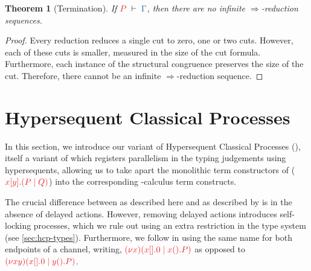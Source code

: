 \documentclass[submission,copyright,creativecommons]{eptcs}
\newtheorem{theorem}[lemma]{Theorem}
\begin{document}
\begin{theorem}[Termination]\label{thm:cp-termination}
  If $\seq[P]{\Gamma}$, then there are no infinite $\Longrightarrow$-reduction sequences.
\end{theorem} 
\begin{proof}
  Every reduction reduces a single cut to zero, one or two cuts. However, each of these cuts is smaller, measured in the size of the cut formula. Furthermore, each instance of the structural congruence preserves the size of the cut. Therefore, there cannot be an infinite $\Longrightarrow$-reduction sequence.
\end{proof}

\section{Hypersequent Classical Processes}
\label{sec:hcp}

In this section, we introduce our variant of Hypersequent Classical Processes (\hcp), itself a variant of \cp which registers parallelism in the typing judgements using hypersequents, allowing us to take apart the monolithic term constructors of \cp (\eg $\tm{\cpSend{x}{y}{P}{Q}}$) into the corresponding \textpi-calculus term constructs.

The crucial difference between \hcp as described here and \dhcp as described by \citet{kokke2019} is in the absence of delayed actions. However, removing delayed actions introduces self-locking processes, which we rule out using an extra restriction in the type system (see \cref{sec:hcp-types}). Furthermore, we follow \cp in using the same name for both endpoints of a channel, writing, \eg $\tm{\cpCut{x}{\cpHalt{x}}{\cpWait{x}{P}}}$ as opposed to $\tm{\cpCut{xy}{\cpHalt{x}}{\cpWait{y}{P}}}$.
\end{document}
